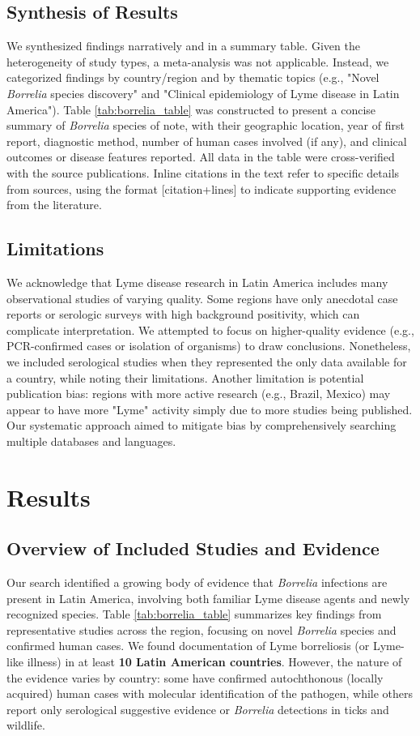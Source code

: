 \documentclass[11pt,letterpaper]{article}
\begin{document}
\subsection{Synthesis of Results}
We synthesized findings narratively and in a summary table. Given the heterogeneity of study types, a meta-analysis was not applicable. Instead, we categorized findings by country/region and by thematic topics (e.g., "Novel \textit{Borrelia} species discovery" and "Clinical epidemiology of Lyme disease in Latin America"). Table \ref{tab:borrelia_table} was constructed to present a concise summary of \textit{Borrelia} species of note, with their geographic location, year of first report, diagnostic method, number of human cases involved (if any), and clinical outcomes or disease features reported. All data in the table were cross-verified with the source publications. Inline citations in the text refer to specific details from sources, using the format [citation+lines] to indicate supporting evidence from the literature.

\subsection{Limitations}
We acknowledge that Lyme disease research in Latin America includes many observational studies of varying quality. Some regions have only anecdotal case reports or serologic surveys with high background positivity, which can complicate interpretation. We attempted to focus on higher-quality evidence (e.g., PCR-confirmed cases or isolation of organisms) to draw conclusions. Nonetheless, we included serological studies when they represented the only data available for a country, while noting their limitations. Another limitation is potential publication bias: regions with more active research (e.g., Brazil, Mexico) may appear to have more "Lyme" activity simply due to more studies being published. Our systematic approach aimed to mitigate bias by comprehensively searching multiple databases and languages.

\section{Results}
\subsection{Overview of Included Studies and Evidence}
Our search identified a growing body of evidence that \textit{Borrelia} infections are present in Latin America, involving both familiar Lyme disease agents and newly recognized species. Table \ref{tab:borrelia_table} summarizes key findings from representative studies across the region, focusing on novel \textit{Borrelia} species and confirmed human cases. We found documentation of Lyme borreliosis (or Lyme-like illness) in at least \textbf{10 Latin American countries}. However, the nature of the evidence varies by country: some have confirmed autochthonous (locally acquired) human cases with molecular identification of the pathogen, while others report only serological suggestive evidence or \textit{Borrelia} detections in ticks and wildlife.
\end{document}

